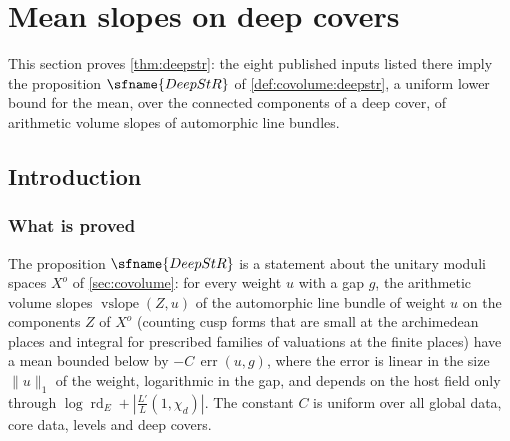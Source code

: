 \section{Mean slopes on deep covers}\label{sec:pf:deepstr}

\providecommand{\deepstrMeanAll}{\operatorname{MeanAll}}
\providecommand{\deepstrMeanGe}{\operatorname{MeanGe}}
\providecommand{\deepstrWtGap}{\operatorname{WtGap}}
\providecommand{\deepstrbnd}{\operatorname{bnd}}
\providecommand{\deepstrerr}{\operatorname{err}}
\providecommand{\deepstrcost}{\operatorname{cost}}
\providecommand{\deepstrclear}{\operatorname{clr}}
\providecommand{\deepstrex}{\operatorname{ex}}
\providecommand{\deepstrspread}{\operatorname{spread}}
\providecommand{\deepstrflagdeg}{\operatorname{fdeg}}
\providecommand{\deepstrdegFl}{\operatorname{deg_{Fl}}}
\providecommand{\deepstrlin}{\operatorname{lin}}
\providecommand{\deepstrslope}{\operatorname{slope}}
\providecommand{\deepstrvol}{\operatorname{vol}}
\providecommand{\deepstrcvol}{\operatorname{cvol}}
\providecommand{\deepstrvsl}{\operatorname{vslope}}
\providecommand{\deepstrtop}{\operatorname{tdeg}}
\providecommand{\deepstrsmall}{\operatorname{Small}}
\providecommand{\deepstrmsmall}{\operatorname{MSmall}}
\providecommand{\deepstrcusp}{\operatorname{Cusp}}
\providecommand{\deepstrComp}{\operatorname{Comp}}
\providecommand{\deepstrlogc}{\operatorname{lc}}
\providecommand{\deepstrII}{\mathrm{II}}
\providecommand{\deepstrarvol}{\widehat{\operatorname{vol}}}
\providecommand{\deepstrgdeg}{\operatorname{gdeg}}
\providecommand{\deepstrrd}{\operatorname{rd}}
\providecommand{\deepstrPrimes}{\mathcal{P}}
\providecommand{\deepstrtr}{\operatorname{tr}}
\providecommand{\deepstrev}{\operatorname{ev}}
\providecommand{\deepstrDim}{D_{\mathrm{Fl}}}

This section proves \cref{thm:deepstr}: the eight published inputs listed there imply the proposition
$\sfname{DeepStR}$ of \cref{def:covolume:deepstr}, a uniform lower bound for the mean, over the connected
components of a deep cover, of arithmetic volume slopes of automorphic line bundles.

\subsection{Introduction}\label{sec:pf:deepstr:intro}

\subsubsection*{What is proved}
The proposition $\sfname{DeepStR}$ is a statement about the unitary moduli spaces $X^o$ of
\cref{sec:covolume}: for every weight $u$ with a gap $g$, the arithmetic volume slopes
$\deepstrvsl(Z,u)$ of the automorphic line bundle of weight $u$ on the components $Z$ of $X^o$ (counting
cusp forms that are small at the archimedean places and integral for prescribed families of valuations at
the finite places) have a mean bounded below by $-C\,\deepstrerr(u,g)$, where the error is linear in the
size $\|u\|_1$ of the weight, logarithmic in the gap, and depends on the host field only through
$\log\deepstrrd_E+|\frac{L'}{L}(1,\chi_d)|$. The constant $C$ is uniform over all global data, core data,
levels and deep covers.


